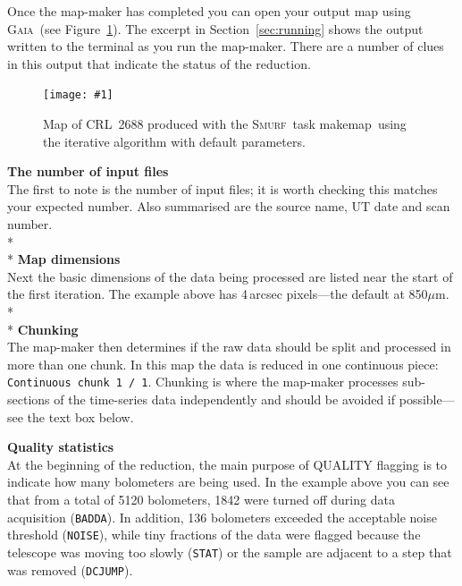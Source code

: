 \documentclass[twoside,11pt]{article}
\newcommand{\htmladdimg}[1]{}
\newcommand{\htmlref}[2]{#1}
\newenvironment{latexonly}{}{}
\newcommand{\html}[1]{}
\newcommand{\latexhtml}[2]{#1}
\newcommand{\xref}[3]{#1}
\renewcommand{\_}{\texttt{\symbol{95}}}
\newcommand{\gaia}{\xref{\textsc{Gaia}}{sun214}{}}
\newcommand{\smurf}{\xref{\textsc{Smurf}}{sun258}{}}
\newcommand{\task}[1]{\textsf{#1}}
\newcommand{\param}[1]{\texttt{#1}}
\newcommand{\makemap}{\xref{\task{makemap}}{sun258}{MAKEMAP}}
\newcommand{\myfig}[6]{
  \begin{figure}#2
    \centering\texttt{[image: \#1]}
    \typeout{#1 inserted on page \arabic{page}}
    \caption[#5]{\label{#4}\small #6}
  \end{figure}
}
\newcommand{\myfig}[6]{
    \label{#4} \htmladdimg{#1.png}\\
    \\
    Figure: #6\\
  }
\newcommand{\cref}[3]{\latexhtml{#1~\ref{#2}}{\htmlref{#3}{#2}}}
\begin{document}
Once the map-maker has completed you can open your output map using
\gaia\ (see \cref{Figure}{fig:itermap}{this example}). The excerpt
in \cref{Section}{sec:running}{Running the iterative map-maker} shows
the output written to the terminal as you run the map-maker. There are
a number of clues in this output that indicate the status of the
reduction.
\begin{latexonly}
\myfig{sc21_crl2688}{[t!]}{width=0.7\linewidth}{fig:itermap}{
  CRL~2688 produced with \makemap}{
  Map of CRL~2688 produced with the \smurf\ task \makemap\ using the
  iterative algorithm with default parameters.
}
\end{latexonly}
\newline\newline
\textbf{The number of input files}\\
The first to note is the number of input files; it is worth checking
this matches your expected number. Also summarised are the source
name, UT date and scan number.
\\*\\*
\textbf{Map dimensions}\\
Next the basic dimensions of the data being processed are listed near
the start of the first iteration. The example above has 4\,arcsec
pixels---the default at 850$\mu$m.
\\*\\*
\textbf{Chunking}\label{box:chunk}\\
The map-maker then determines if the raw data should be split and
processed in more than one chunk. In this map the data is reduced in
one continuous piece: \param{Continuous chunk 1 / 1}. Chunking is
where the map-maker processes sub-sections of the time-series data
independently and should be avoided if possible---see the text box
below.
\html{\newline}

\begin{htmlonly}
\htmladdimg{sc21_data_chunking.png}
\newline\newline
\end{htmlonly}

\textbf{Quality statistics}\\
At the beginning of the reduction, the main purpose of QUALITY
flagging is to indicate how many bolometers are being used. In the
example above you can see that from a total of 5120 bolometers, 1842
were turned off during data acquisition (\texttt{BADDA}). In addition,
136 bolometers
exceeded the acceptable noise threshold (\texttt{NOISE}), while tiny
fractions of the data were flagged because the telescope was moving
too slowly (\texttt{STAT}) or the sample are adjacent to a step that
was removed (\texttt{DCJUMP}).
\end{document}
